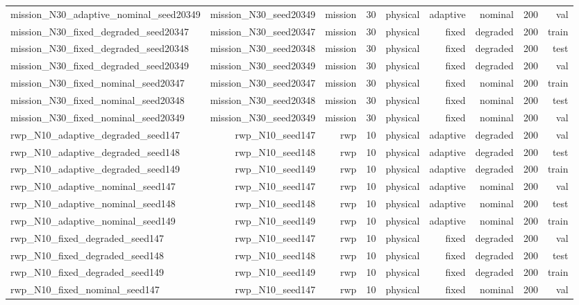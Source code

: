 \begin{tabular}{lrrrrrrrr}
mission\_N30\_adaptive\_nominal\_seed20349 & mission\_N30\_seed20349 & mission & 30 & physical & adaptive & nominal & 200 & val \\
mission\_N30\_fixed\_degraded\_seed20347 & mission\_N30\_seed20347 & mission & 30 & physical & fixed & degraded & 200 & train \\
mission\_N30\_fixed\_degraded\_seed20348 & mission\_N30\_seed20348 & mission & 30 & physical & fixed & degraded & 200 & test \\
mission\_N30\_fixed\_degraded\_seed20349 & mission\_N30\_seed20349 & mission & 30 & physical & fixed & degraded & 200 & val \\
mission\_N30\_fixed\_nominal\_seed20347 & mission\_N30\_seed20347 & mission & 30 & physical & fixed & nominal & 200 & train \\
mission\_N30\_fixed\_nominal\_seed20348 & mission\_N30\_seed20348 & mission & 30 & physical & fixed & nominal & 200 & test \\
mission\_N30\_fixed\_nominal\_seed20349 & mission\_N30\_seed20349 & mission & 30 & physical & fixed & nominal & 200 & val \\
rwp\_N10\_adaptive\_degraded\_seed147 & rwp\_N10\_seed147 & rwp & 10 & physical & adaptive & degraded & 200 & val \\
rwp\_N10\_adaptive\_degraded\_seed148 & rwp\_N10\_seed148 & rwp & 10 & physical & adaptive & degraded & 200 & test \\
rwp\_N10\_adaptive\_degraded\_seed149 & rwp\_N10\_seed149 & rwp & 10 & physical & adaptive & degraded & 200 & train \\
rwp\_N10\_adaptive\_nominal\_seed147 & rwp\_N10\_seed147 & rwp & 10 & physical & adaptive & nominal & 200 & val \\
rwp\_N10\_adaptive\_nominal\_seed148 & rwp\_N10\_seed148 & rwp & 10 & physical & adaptive & nominal & 200 & test \\
rwp\_N10\_adaptive\_nominal\_seed149 & rwp\_N10\_seed149 & rwp & 10 & physical & adaptive & nominal & 200 & train \\
rwp\_N10\_fixed\_degraded\_seed147 & rwp\_N10\_seed147 & rwp & 10 & physical & fixed & degraded & 200 & val \\
rwp\_N10\_fixed\_degraded\_seed148 & rwp\_N10\_seed148 & rwp & 10 & physical & fixed & degraded & 200 & test \\
rwp\_N10\_fixed\_degraded\_seed149 & rwp\_N10\_seed149 & rwp & 10 & physical & fixed & degraded & 200 & train \\
rwp\_N10\_fixed\_nominal\_seed147 & rwp\_N10\_seed147 & rwp & 10 & physical & fixed & nominal & 200 & val \\

\end{tabular}
